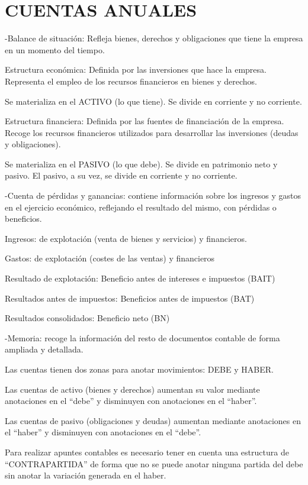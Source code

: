 \documentclass[12pt, twoside, openright]{report} %
\begin{document}
\section{CUENTAS ANUALES}
-Balance de situación: Refleja bienes, derechos y obligaciones que tiene la empresa en un momento del tiempo.

Estructura económica: Definida por las inversiones que hace la empresa. Representa el empleo de los recursos financieros en bienes y derechos.

Se materializa en el ACTIVO (lo que tiene). Se divide en corriente y no corriente.

Estructura financiera: Definida por las fuentes de financiación de la empresa. Recoge los recursos financieros utilizados para desarrollar las inversiones (deudas y obligaciones).

Se materializa en el PASIVO (lo que debe). Se divide en patrimonio neto y pasivo. El pasivo, a su vez, se divide en corriente y no corriente.

-Cuenta de pérdidas y ganancias: contiene información sobre los ingresos y gastos en el ejercicio económico, reflejando el resultado del mismo, con pérdidas o beneficios.

Ingresos: de explotación (venta de bienes y servicios) y financieros.

Gastos: de explotación (costes de las ventas) y financieros

Resultado de explotación: Beneficio antes de intereses e impuestos (BAIT)

Resultados antes de impuestos: Beneficios antes de impuestos (BAT)

Resultados consolidados: Beneficio neto (BN)

-Memoria: recoge la información del resto de documentos contable de forma ampliada y detallada.

Las cuentas tienen dos zonas para anotar movimientos: DEBE y HABER.

Las cuentas de activo (bienes y derechos) aumentan su valor mediante anotaciones en el “debe” y disminuyen con anotaciones en el “haber”.

Las cuentas de pasivo (obligaciones y deudas) aumentan mediante anotaciones en el “haber” y disminuyen con anotaciones en el “debe”.

Para realizar apuntes contables es necesario tener en cuenta una estructura de “CONTRAPARTIDA” de forma que no se puede anotar ninguna partida del debe sin anotar la variación generada en el haber.
\end{document}
